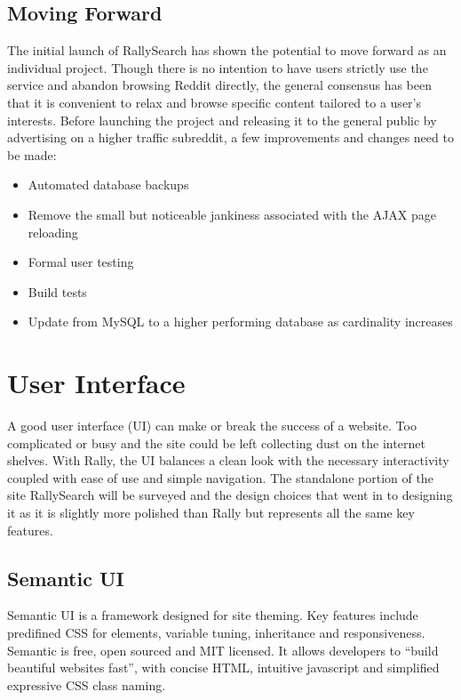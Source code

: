 \documentclass[msc,oneside]{ubcthesis}%
\begin{document}
\subsection{Moving Forward}
The initial launch of RallySearch has shown the potential to move forward as an individual project. Though there is no intention to have users strictly use the service and abandon browsing Reddit directly, the general consensus has been that it is convenient to relax and browse specific content tailored to a user's interests. Before launching the project and releasing it to the general public by advertising on a higher traffic subreddit, a few improvements and changes need to be made:
\begin{itemize}
\item{Automated database backups}
\item{Remove the small but noticeable jankiness associated with the AJAX page reloading}
\item{Formal user testing}
\item{Build tests}
\item{Update from MySQL to a higher performing database as cardinality increases}
\end{itemize}

\newpage %
\pagestyle{fancy}\rhead{}\cfoot{}\rfoot{\thepage}


\section{User Interface}
A good user interface (UI) can make or break the success of a website. Too complicated or busy and the site could be left collecting dust on the internet shelves. With Rally, the UI balances a clean look with the necessary interactivity coupled with ease of use and simple navigation. The standalone portion of the site RallySearch will be surveyed and the design choices that went in to designing it as it is slightly more polished than Rally but represents all the same key features.
\subsection{Semantic UI}
Semantic UI is a framework designed for site theming. Key features include predifined CSS for elements, variable tuning, inheritance and responsiveness. Semantic is free, open sourced and MIT licensed. It allows developers to ``build beautiful websites fast'', with concise HTML, intuitive javascript and simplified expressive CSS class naming.
\end{document}

